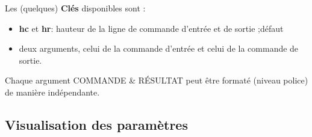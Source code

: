 \documentclass{article}
\newcommand\Cle[1]{{\bfseries\sffamily\textlangle #1\textrangle}}
\begin{document}
\begin{codetex}
\end{codetex}

\begin{codecles}
Les (quelques) \Cle{Clés} disponibles sont :

\begin{itemize}
	\item \Cle{hc} et \Cle{hr}: hauteur de la ligne de commande d'entrée et de sortie ;\hfill{}défaut \Cle{0.75}
	\item deux \textsf{arguments}, celui de la commande d'entrée et celui de la commande de sortie.
\end{itemize}
%
Chaque argument \textsf{COMMANDE} \& \textsf{RÉSULTAT} peut être formaté (niveau police) de manière indépendante.
\end{codecles}

\begin{codetex}
\paramCF[titre=true,couleurcmd=olive,couleurres=orange]
\end{codetex}

\subsection{Visualisation des paramètres}
\end{document}

